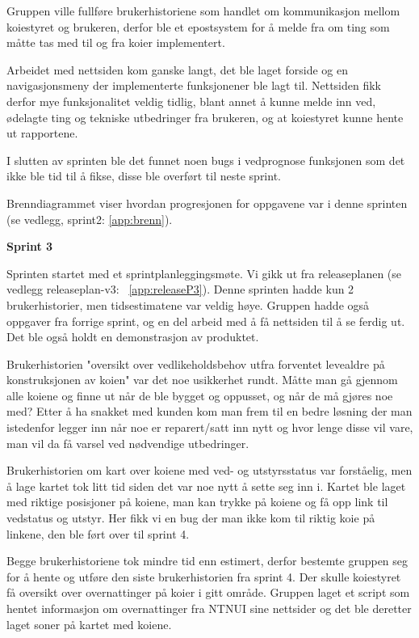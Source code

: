 \documentclass[12pt,a4paper,norsk]{article}
\begin{document}
Gruppen ville fullføre brukerhistoriene som handlet om kommunikasjon mellom koiestyret og brukeren, derfor ble et epostsystem for å melde fra om ting som måtte tas med til og fra koier implementert.

Arbeidet med nettsiden kom ganske langt, det ble laget forside og en navigasjonsmeny der implementerte funksjonener ble lagt til. Nettsiden fikk derfor mye funksjonalitet veldig tidlig, blant annet å kunne melde inn ved, ødelagte ting og tekniske utbedringer fra brukeren, og at koiestyret kunne hente ut rapportene.

I slutten av sprinten ble det funnet noen bugs i vedprognose funksjonen som det ikke ble tid til å fikse, disse ble overført til neste sprint.

Brenndiagrammet viser hvordan progresjonen for oppgavene var i denne sprinten (se vedlegg, sprint2: \cref{app:brenn}).

\bigskip \noindent \textbf{Sprint 3}
\par Sprinten startet med et sprintplanleggingsmøte. Vi gikk ut fra releaseplanen (se vedlegg releaseplan-v3: ~\cref{app:releaseP3}). Denne sprinten hadde kun 2 brukerhistorier, men tidsestimatene var veldig høye. Gruppen hadde også oppgaver fra forrige sprint, og en del arbeid med å få nettsiden til å se ferdig ut. Det ble også holdt en demonstrasjon av produktet.

Brukerhistorien "oversikt over vedlikeholdsbehov utfra forventet levealdre på konstruksjonen av koien" var det noe usikkerhet rundt. Måtte man gå gjennom alle koiene og finne ut når de ble bygget og oppusset, og når de må gjøres noe med? Etter å ha snakket med kunden kom man frem til en bedre løsning der man istedenfor legger inn når noe er reparert/satt inn nytt og hvor lenge disse vil vare, man vil da få varsel ved nødvendige utbedringer.

Brukerhistorien om kart over koiene med ved- og utstyrsstatus var forståelig, men å lage kartet tok litt tid siden det var noe nytt å sette seg inn i. Kartet ble laget med riktige posisjoner på koiene, man kan trykke på koiene og få opp link til vedstatus og utstyr. Her fikk vi en bug der man ikke kom til riktig koie på linkene, den ble ført over til sprint 4.

Begge brukerhistoriene tok mindre tid enn estimert, derfor bestemte gruppen seg for å hente og utføre den siste brukerhistorien fra sprint 4. Der skulle koiestyret få oversikt over overnattinger på koier i gitt område. Gruppen laget et script som hentet informasjon om overnattinger fra NTNUI sine nettsider og det ble deretter laget soner på kartet med koiene.
\end{document}
